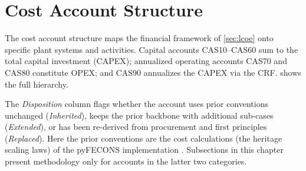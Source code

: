 \documentclass{article}
\begin{document}
\section{Cost Account Structure}
\label{sec:cas}

The cost account structure maps the financial framework of
\cref{sec:lcoe} onto specific plant systems and activities. Capital
accounts CAS10--CAS60 sum to the total capital investment (CAPEX);
annualized operating accounts CAS70 and CAS80 constitute OPEX; and
CAS90 annualizes the CAPEX via the CRF. 
shows the full hierarchy.

The \emph{Disposition} column flags whether the account uses prior
conventions unchanged (\emph{Inherited}), keeps the prior backbone
with additional sub-cases (\emph{Extended}), or has been re-derived
from procurement and first principles (\emph{Replaced}). Here the prior
conventions are the cost calculations (the heritage scaling laws) of the
pyFECONS implementation \citep{woodruff2026, woodruff2026b}. Subsections in this chapter present
methodology only for accounts in the latter two categories.
\end{document}
